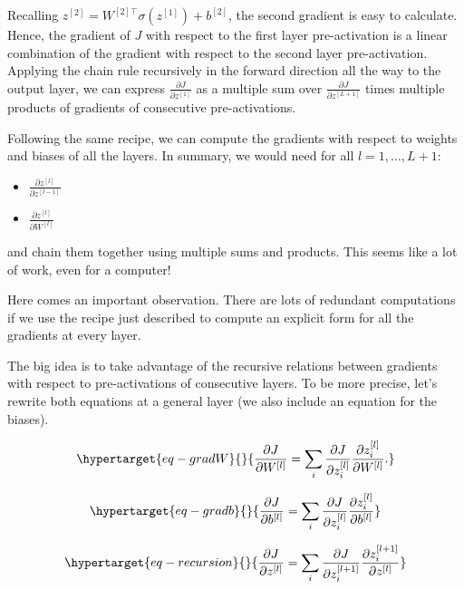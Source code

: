\documentclass[
  letterpaper,
  DIV=11,
  numbers=noendperiod]{scrartcl}
\begin{document}
Recalling \(z^{[2]} = W^{[2]\top} \sigma(z^{[1]}) + b^{[2]}\), the
second gradient is easy to calculate. Hence, the gradient of \(J\) with
respect to the first layer pre-activation is a linear combination of the
gradient with respect to the second layer pre-activation. Applying the
chain rule recursively in the forward direction all the way to the
output layer, we can express \(\frac{\partial J}{\partial z^{[1]}}\) as
a multiple sum over \(\frac{\partial J}{\partial z^{[L+1]}}\) times
multiple products of gradients of consecutive pre-activations.

Following the same recipe, we can compute the gradients with respect to
weights and biases of all the layers. In summary, we would need for all
\(l=1,\ldots,L+1\):

\begin{itemize}
    \item $\frac{\partial z^{[l]}}{\partial z^{[l-1]}}$
    \item $\frac{\partial z^{[l]}}{\partial W^{[l]}}$
\end{itemize}

and chain them together using multiple sums and products. This seems
like a lot of work, even for a computer!

Here comes an important observation. There are lots of redundant
computations if we use the recipe just described to compute an explicit
form for all the gradients at every layer.

The big idea is to take advantage of the recursive relations between
gradients with respect to pre-activations of consecutive layers. To be
more precise, let's rewrite both equations at a general layer (we also
include an equation for the biases).

\begin{equation}\protect\hypertarget{eq-gradW}{}{
\frac{\partial J}{\partial W^{[l]}} = \sum_i \frac{\partial J}{\partial z^{[l]}_i} \frac{\partial z^{[l]}_i}{\partial W^{[l]}}.
}\label{eq-gradW}\end{equation}

\begin{equation}\protect\hypertarget{eq-gradb}{}{\frac{\partial J}{\partial b^{[l]}} = \sum_i \frac{\partial J}{\partial z^{[l]}_i} \frac{\partial z^{[l]}_i}{\partial b^{[l]}}
}\label{eq-gradb}\end{equation}

\begin{equation}\protect\hypertarget{eq-recursion}{}{\frac{\partial J}{\partial z^{[l]}} = \sum_i \frac{\partial J}{\partial z^{[l+1]}_i} \frac{\partial z^{[l+1]}_i}{\partial z^{[l]}}
}\label{eq-recursion}\end{equation}
\end{document}
